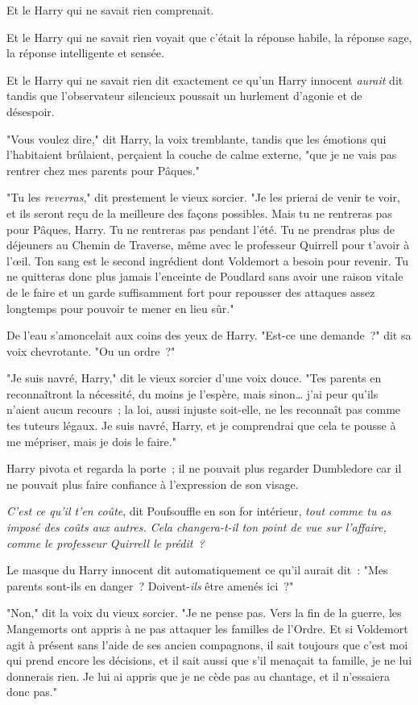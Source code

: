 Et le Harry qui ne savait rien comprenait.

Et le Harry qui ne savait rien voyait que c'était la réponse habile, la réponse sage, la réponse intelligente et sensée.

Et le Harry qui ne savait rien dit exactement ce qu'un Harry innocent \emph{aurait} dit tandis que l'observateur silencieux poussait un hurlement d'agonie et de désespoir.

"Vous voulez dire," dit Harry, la voix tremblante, tandis que les émotions qui l'habitaient brûlaient, perçaient la couche de calme externe, "que je ne vais pas rentrer chez mes parents pour Pâques."

"Tu les \emph{reverras}," dit prestement le vieux sorcier. "Je les prierai de venir te voir, et ils seront reçu de la meilleure des façons possibles. Mais tu ne rentreras pas pour Pâques, Harry. Tu ne rentreras pas pendant l'été. Tu ne prendras plus de déjeuners au Chemin de Traverse, même avec le professeur Quirrell pour t'avoir à l'œil. Ton sang est le second ingrédient dont Voldemort a besoin pour revenir. Tu ne quitteras donc plus jamais l'enceinte de Poudlard sans avoir une raison vitale de le faire et un garde suffisamment fort pour repousser des attaques assez longtemps pour pouvoir te mener en lieu sûr."

De l'eau s'amoncelait aux coins des yeux de Harry. "Est-ce une demande~?" dit sa voix chevrotante. "Ou un ordre~?"

"Je suis navré, Harry," dit le vieux sorcier d'une voix douce. "Tes parents en reconnaîtront la nécessité, du moins je l'espère, mais sinon… j'ai peur qu'ils n'aient aucun recours~; la loi, aussi injuste soit-elle, ne les reconnaît pas comme tes tuteurs légaux. Je suis navré, Harry, et je comprendrai que cela te pousse à me mépriser, mais je dois le faire."

Harry pivota et regarda la porte~; il ne pouvait plus regarder Dumbledore car il ne pouvait plus faire confiance à l'expression de son visage.

\emph{C'est ce qu'il t'en coûte}, dit Poufsouffle en son for intérieur, \emph{tout comme tu as imposé des coûts aux autres. Cela changera-t-il ton point de vue sur l'affaire, comme le professeur Quirrell le prédit~?}

Le masque du Harry innocent dit automatiquement ce qu'il aurait dit~: "Mes parents sont-ils en danger~? Doivent-\emph{ils} être amenés ici~?"

"Non," dit la voix du vieux sorcier. "Je ne pense pas. Vers la fin de la guerre, les Mangemorts ont appris à ne pas attaquer les familles de l'Ordre. Et si Voldemort agit à présent sans l'aide de ses ancien compagnons, il sait toujours que c'est moi qui prend encore les décisions, et il sait aussi que s'il menaçait ta famille, je ne lui donnerais rien. Je lui ai appris que je ne cède pas au chantage, et il n'essaiera donc pas."


